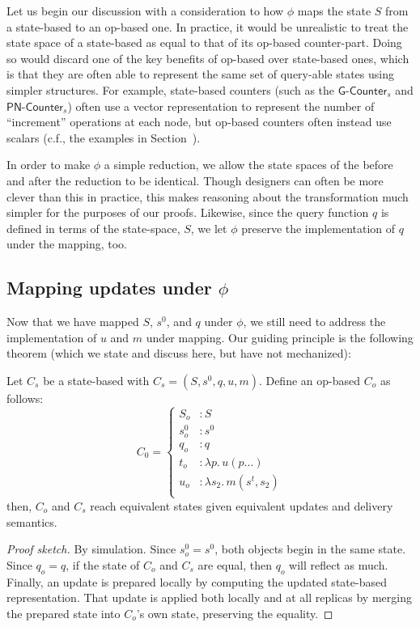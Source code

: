 Let us begin our discussion with a consideration to how $\phi$ maps the state
$S$ from a state-based \CRDT to an op-based one. In practice, it would be
unrealistic to treat the state space of a state-based \CRDT as equal to that of
its op-based counter-part. Doing so would discard one of the key benefits of
op-based \CRDTs over state-based ones, which is that they are often able to
represent the same set of query-able states using simpler structures. For
example, state-based counters (such as the $\textsf{G-Counter}_s$ and
$\textsf{PN-Counter}_s$) often use a vector representation to represent the
number of ``increment'' operations at each node, but op-based counters often
instead use scalars (c.f., the examples in
Section~\label{sec:example-gcounter}).

In order to make $\phi$ a simple reduction, we allow the state spaces of the
\CRDT before and after the reduction to be identical. Though \CRDT designers can
often be more clever than this in practice, this makes reasoning about the
transformation much simpler for the purposes of our proofs.  Likewise, since the
query function $q$ is defined in terms of the state-space, $S$, we let $\phi$
preserve the implementation of $q$ under the mapping, too.

\subsection{Mapping updates under $\phi$}
Now that we have mapped $S$, $s^0$, and $q$ under $\phi$, we still need to
address the implementation of $u$ and $m$ under mapping. Our guiding principle
is the following theorem (which we state and discuss here, but have not
mechanized):
\begin{theorem}
  Let $C_s$ be a state-based \CRDT with $C_s = (S, s^0, q, u, m)$. Define an
  op-based \CRDT $C_o$ as follows:
  \[
    C_0 = \left\{ \begin{aligned}
      S_o &: S \\
      s^0_o &: s^0 \\
      q_o &: q \\
      t_o &: \lambda p.\, u(p...) \\
      u_o &: \lambda s_2.\, m(s^t, s_2) \\
    \end{aligned} \right.
  \]
  then, $C_o$ and $C_s$ reach equivalent states given equivalent updates and
  delivery semantics.
\end{theorem}
\begin{proof}[Proof sketch]
By simulation. Since $s^0_o = s^0$, both objects begin in the same state. Since
$q_o = q$, if the state of $C_o$ and $C_s$ are equal, then $q_o$ will reflect as
much. Finally, an update is prepared locally by computing the updated
state-based representation. That update is applied both locally and at all
replicas by merging the prepared state into $C_o$'s own state, preserving the
equality.
\end{proof}

